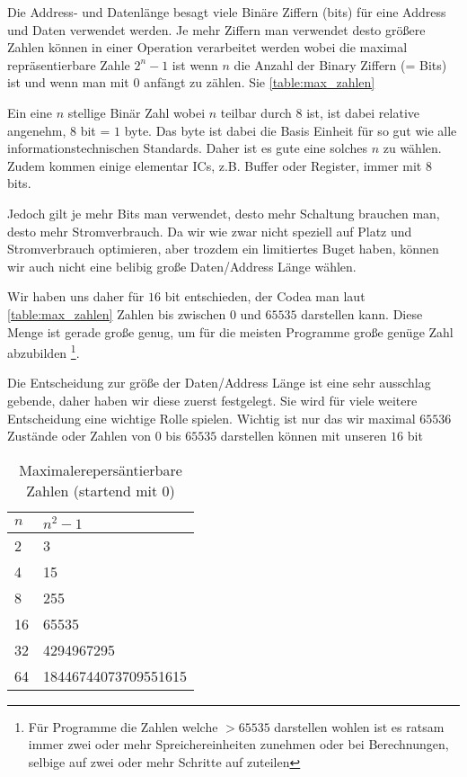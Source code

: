 \documentclass{scrartcl}
\begin{document}
Die Address- und Datenlänge besagt viele Binäre Ziffern (bits) für eine Address und Daten verwendet werden. Je mehr Ziffern man verwendet desto größere Zahlen können in einer Operation verarbeitet werden wobei die maximal repräsentierbare Zahle $2^n - 1$ ist wenn $n$ die Anzahl der Binary Ziffern (= Bits) ist und wenn man mit $0$ anfängt zu zählen. Sie \autoref{table:max_zahlen}

Ein eine $n$ stellige Binär Zahl wobei $n$ teilbar durch $8$ ist, ist dabei relative angenehm, $8$ bit = $1$ byte. Das byte ist dabei die Basis Einheit für so gut wie alle informationstechnischen Standards. Daher ist es gute eine solches $n$ zu wählen.
Zudem kommen einige elementar ICs, z.B. Buffer oder Register, immer mit 8 bits.

Jedoch gilt je mehr Bits man verwendet, desto mehr Schaltung brauchen man, desto mehr Stromverbrauch. Da wir wie zwar nicht speziell auf Platz und Stromverbrauch optimieren, aber trozdem ein limitiertes Buget haben, können wir auch nicht eine belibig große Daten/Address Länge wählen.

Wir haben uns daher für $16$ bit entschieden, der Codea man laut \autoref{table:max_zahlen} Zahlen bis zwischen $0$ und $65535$ darstellen kann. Diese Menge ist gerade große genug, um für die meisten Programme große genüge Zahl abzubilden
\footnote{Für Programme die Zahlen welche $> 65535$ darstellen wohlen ist es ratsam immer zwei oder mehr Spreichereinheiten zunehmen oder bei Berechnungen, selbige auf zwei oder mehr Schritte auf zuteilen}.

Die Entscheidung zur größe der Daten/Address Länge ist eine sehr ausschlag gebende, daher haben wir diese zuerst festgelegt. Sie wird für viele weitere Entscheidung eine wichtige Rolle spielen. Wichtig ist nur das wir maximal $65536$ Zustände oder Zahlen von $0$ bis $65535$ darstellen können mit unseren $16$ bit

\begin{center}
	\begin{table}[h]
		\caption{\label{table:max_zahlen} Maximalerepersäntierbare Zahlen (startend mit 0)}
		\begin{tabular}{ l | l }
 		$n$ & $n^2 - 1$ \\
		\hline 
		2 & 3\\  
		4 & 15\\
		8 & 255\\
		16 & 65535\\
 		32 & 4294967295\\
 		64 & 18446744073709551615\\
		\end{tabular}
	\end{table}
\end{center}
\end{document}
